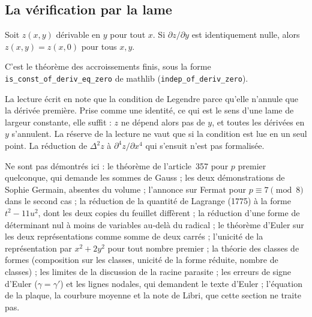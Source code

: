 \subsection*{La vérification par la lame}

\begin{enonce}[Énoncé de l'édition, d'après la vue 53, la condition $dz/dy = 0$]
Soit $z(x, y)$ dérivable en $y$ pour tout $x$. Si $\partial z/\partial y$ est identiquement nulle, alors $z(x, y) = z(x, 0)$ pour tous $x, y$.
\end{enonce}

C'est le théorème des accroissements finis, sous la forme \texttt{is\_const\_of\_deriv\_eq\_zero} de mathlib (\texttt{indep\_of\_deriv\_zero}).

\begin{remarque}
La lecture écrit en note que la condition de Legendre  parce qu'elle n'annule que la dérivée première. Prise comme une identité, ce qui est le sens d'une lame de largeur constante, elle suffit : $z$ ne dépend alors pas de $y$, et toutes les dérivées en $y$ s'annulent. La réserve de la lecture ne vaut que si la condition est lue en un seul point. La réduction de $\Delta^2 z$ à $\partial^4 z/\partial x^4$ qui s'ensuit n'est pas formalisée.
\end{remarque}

Ne sont pas démontrés ici : le théorème de l'article~357 pour $p$ premier quelconque, qui demande les sommes de Gauss ; les deux démonstrations de Sophie Germain, absentes du volume ; l'annonce sur Fermat pour $p \equiv 7 \pmod 8$ dans le second cas ; la réduction de la quantité de Lagrange (1775) à la forme $t^2 - 11u^2$, dont les deux copies du feuillet diffèrent ; la réduction d'une forme de déterminant nul à moins de variables au-delà du radical ; le théorème d'Euler sur les deux représentations comme somme de deux carrés ; l'unicité de la représentation par $x^2 + 2y^2$ pour tout nombre premier ; la théorie des classes de formes (composition sur les classes, unicité de la forme réduite, nombre de classes) ; les limites de la discussion de la racine parasite ; les erreurs de signe d'Euler ($\gamma = \gamma'$) et les lignes nodales, qui demandent le texte d'Euler ; l'équation de la plaque, la courbure moyenne et la note de Libri, que cette section ne traite pas.
